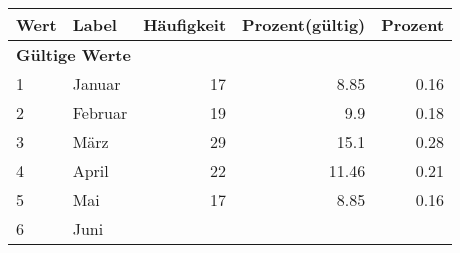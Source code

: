      \begin{longtable}{lXrrr}
     \toprule
     \textbf{Wert} & \textbf{Label} & \textbf{Häufigkeit} & \textbf{Prozent(gültig)} & \textbf{Prozent} \\
     \endhead
     \midrule
     \multicolumn{5}{l}{\textbf{Gültige Werte}}\\

     1 &
     \multicolumn{1}{X}{ Januar   } &


       \num{17} &
       \num[round-mode=places,round-precision=2]{8.85} &
         \num[round-mode=places,round-precision=2]{0.16} \\

     2 &
     \multicolumn{1}{X}{ Februar   } &


       \num{19} &
       \num[round-mode=places,round-precision=2]{9.9} &
         \num[round-mode=places,round-precision=2]{0.18} \\

     3 &
     \multicolumn{1}{X}{ März   } &


       \num{29} &
       \num[round-mode=places,round-precision=2]{15.1} &
         \num[round-mode=places,round-precision=2]{0.28} \\

     4 &
     \multicolumn{1}{X}{ April   } &


       \num{22} &
       \num[round-mode=places,round-precision=2]{11.46} &
         \num[round-mode=places,round-precision=2]{0.21} \\

     5 &
     \multicolumn{1}{X}{ Mai   } &


       \num{17} &
       \num[round-mode=places,round-precision=2]{8.85} &
         \num[round-mode=places,round-precision=2]{0.16} \\

     6 &
     \multicolumn{1}{X}{ Juni   } &



\end{longtable}
